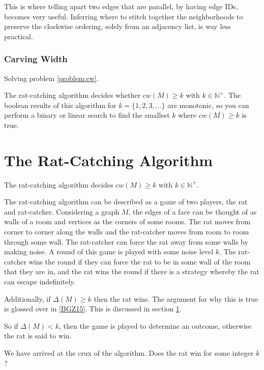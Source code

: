 \documentclass{article}
\begin{document}
			This is where telling apart two edges that are parallel, by having edge IDs, becomes very useful. Inferring where to stitch together the neighborhoods to preserve the clockwise ordering, solely from an adjacency list, is way less practical.


		\subsubsection{Carving Width}

			Solving problem \ref{problem:cw}.

			The rat-catching algorithm decides whether $cw(M) \geq k$ with $k \in \mathbb{N}^+$. The boolean results of this algorithm for $k=\{1,2,3,...\}$ are monotonic, so you can perform a binary or linear search to find the smallest $k$ where $cw(M) \geq k$ is true.


	\section{The Rat-Catching Algorithm}

		The rat-catching algorithm decides $cw(M) \geq k$ with $k \in \mathbb{N}^+$.

		The rat-catching algorithm can be described as a game of two players, the rat and rat-catcher. Considering a graph $M$, the edges of a face can be thought of as walls of a room and vertices as the corners of some rooms. The rat moves from corner to corner along the walls and the rat-catcher moves from room to room through some wall. The rat-catcher can force the rat away from some walls by making noise. A round of this game is played with some noise level $k$. The rat-catcher wins the round if they can force the rat to be in some wall of the room that they are in, and the rat wins the round if there is a strategy whereby the rat can escape indefinitely.

		Additionally, if $\Delta(M) \geq k$ then the rat wins. The argument for why this is true is glossed over in \ref{BGZ15}. This is discussed in section \ref{}.

		So if $\Delta(M) < k$, then the game is played to determine an outcome, otherwise the rat is said to win.

		We have arrived at the crux of the algorithm. Does the rat win for some integer $k$?
\end{document}
